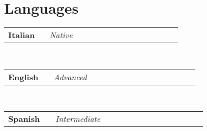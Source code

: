 \newcommand{\lang}[2]
  {\small \color{maincolor}
    \begin{tabular}{@{} p{0.2\linewidth} p{0.64\linewidth}}
      \textbf{\color{hlcolor-0} #1} & \emph{\color{hlcolor-1} #2}
    \end{tabular}
  }


\section*{Languages}
\begin{cvcontent}
  \lang{Italian}{Native}\\ [0.5mm]
  \lang{English}{Advanced}\\ [0.5mm]
  \lang{Spanish}{Intermediate}
\end{cvcontent}